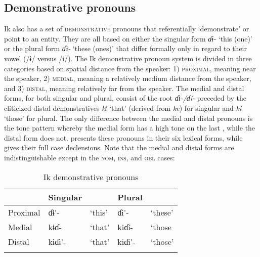 \subsection{Demonstrative pronouns}\label{sec:5.6}


Ik also has a set of \textsc{demonstrative} pronouns that referentially ‘demonstrate’ or point to an entity. They are all based on either the singular form \textit{ɗɨ{}-} ‘this (one)’ or the plural form \textit{ɗi-} ‘these (ones)’ that differ formally only in regard to their vowel (/ɨ/ versus /i/). The Ik demonstrative pronoun system is divided in three categories based on spatial distance from the speaker: 1) \textsc{proximal}, meaning near the speaker, 2) \textsc{medial}, meaning a relatively medium distance from the speaker, and 3) \textsc{distal}, meaning relatively far from the speaker. The medial and distal forms, for both singular and plural, consist of the root \textit{ɗɨ{}-/ɗi-} preceded by the cliticized distal demonstratives \textit{kɨ} ‘that’ (derived from \textit{ke}) for singular and \textit{ki} ‘those’ for plural. The only difference between the medial and distal pronouns is the tone pattern whereby the medial form has a high tone on the last , while the distal form does not.  presents these pronouns in their six lexical forms, while  gives their full case declensions. Note that the medial and distal forms are indistinguishable except in the \textsc{nom}, \textsc{ins}, and \textsc{obl} cases:


\begin{table}
\caption{Ik demonstrative pronouns}
\label{tab:pro:dem1}


\begin{tabularx}{\textwidth}{XXXXX}
\lsptoprule

& Singular &  & Plural & \\
\midrule
Proximal & ɗɨ\'{}- & ‘this’ & ɗi\'{}- & ‘these’\\
Medial & kɨɗ{\Í}- & ‘that’ & kiɗ\'{i}- & ‘those\\
Distal & kɨɗɨ\'{}- & ‘that’ & kiɗi\'{}- & ‘those’\\
\lspbottomrule
\end{tabularx}
\end{table}

